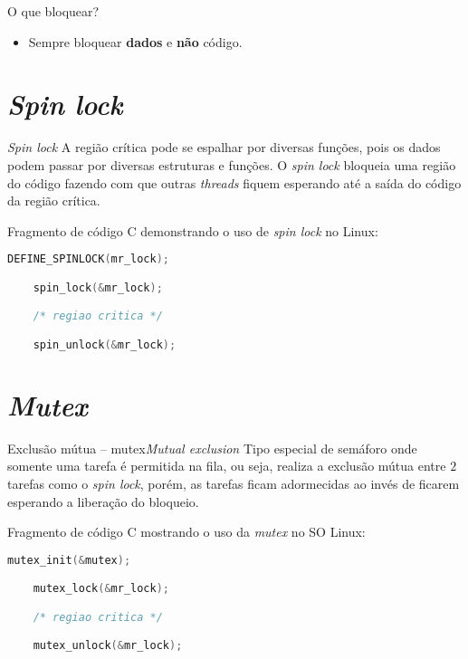 \begin{frame}{O que bloquear?}

  \begin{itemize}
  \item Sempre bloquear \alert{\bf dados} e {\bf não} {\color{red!90!gray}código}.
  \end{itemize}

\end{frame}



\def\thetitle{{\em Spin lock}}
\section{\thetitle}
\begin{frame}[fragile]{\thetitle}
\small
A região crítica pode se espalhar por diversas funções, pois os \alert{dados}
podem passar por diversas estruturas e funções. O \alert{\em spin lock}
bloqueia uma região do código fazendo com que outras {\em threads}
fiquem esperando até a saída do código da região crítica.\\
\bigskip

Fragmento de código C demonstrando o uso  de \alert{\em spin lock} no Linux:

  \begin{lstlisting}[language=c,frame=single]
    DEFINE_SPINLOCK(mr_lock);

    spin_lock(&mr_lock);

    /* regiao critica */

    spin_unlock(&mr_lock);
  \end{lstlisting}


\end{frame}


\def\thetitle{\em Mutex}
\section{\thetitle}

\begin{frame}[fragile]{Exclusão mútua -- mutex}{\em Mutual exclusion}
  \small
  Tipo especial de semáforo onde somente uma tarefa é permitida na
  fila, ou seja, realiza a exclusão mútua entre $2$ tarefas como o
  \alert{\em spin lock}, porém, as tarefas ficam \alert{adormecidas} ao invés de
  ficarem esperando a liberação do bloqueio.\\
\bigskip

Fragmento de código C mostrando o uso da \alert{\em mutex} no SO Linux:

  \begin{lstlisting}[language=c,frame=single]
    mutex_init(&mutex);

    mutex_lock(&mr_lock);

    /* regiao critica */

    mutex_unlock(&mr_lock);
  \end{lstlisting}
  
\end{frame}

